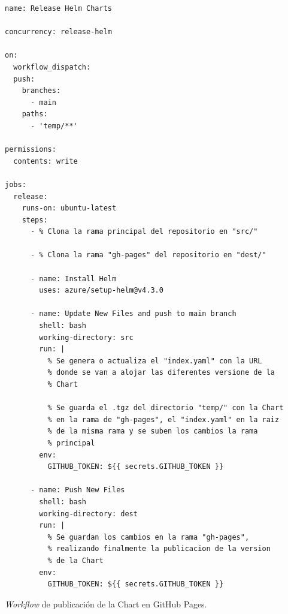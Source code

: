 \begin{longlisting}
  \begin{verbatim}
name: Release Helm Charts

concurrency: release-helm

on:
  workflow_dispatch:
  push:
    branches:
      - main
    paths:
      - 'temp/**'

permissions:
  contents: write

jobs:
  release:
    runs-on: ubuntu-latest
    steps:
      - % Clona la rama principal del repositorio en "src/"

      - % Clona la rama "gh-pages" del repositorio en "dest/"

      - name: Install Helm
        uses: azure/setup-helm@v4.3.0

      - name: Update New Files and push to main branch
        shell: bash
        working-directory: src
        run: |
          % Se genera o actualiza el "index.yaml" con la URL
          % donde se van a alojar las diferentes versione de la
          % Chart

          % Se guarda el .tgz del directorio "temp/" con la Chart
          % en la rama de "gh-pages", el "index.yaml" en la raiz
          % de la misma rama y se suben los cambios la rama
          % principal
        env:
          GITHUB_TOKEN: ${{ secrets.GITHUB_TOKEN }}

      - name: Push New Files
        shell: bash
        working-directory: dest
        run: |
          % Se guardan los cambios en la rama "gh-pages",
          % realizando finalmente la publicacion de la version
          % de la Chart
        env:
          GITHUB_TOKEN: ${{ secrets.GITHUB_TOKEN }}
  \end{verbatim}
  \caption{\textit{Workflow} de publicación de la Chart en GitHub Pages.}
  \label{lst:ghpages}
\end{longlisting}

